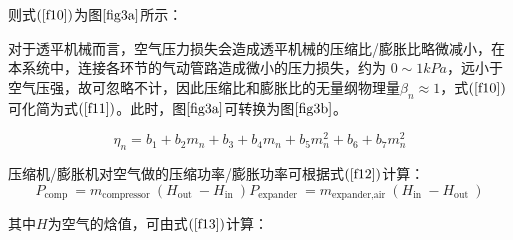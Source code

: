 \documentclass{jnuthesis}
\begin{document}
	则式$ (\fontsize{10.5bp}{10pt}\ref{f10}) $为图$ \fontsize{10.5bp}{10pt}\ref{fig3a} $所示：
	
	
	对于透平机械而言，空气压力损失会造成透平机械的压缩比/膨胀比略微减小，在本系统中，连接各环节的气动管路造成微小的压力损失，约为 $ 0\sim 1 k P a $，远小于空气压强，故可忽略不计，因此压缩比和膨胀比的无量纲物理量$ \beta_{n} \approx 1 $，式$ (\fontsize{10.5bp}{10pt}\ref{f10}) $可化简为式$ (\fontsize{10.5bp}{10pt}\ref{f11}) $。此时，图$ \fontsize{10.5bp}{10pt}\ref{fig3a} $可转换为图$ \fontsize{10.5bp}{10pt}\ref{fig3b} $。
	
	\begin{equation}\label{f11}
		\eta_{n}=b_{1}+b_{2} m_{n}+b_{3}+b_{4} m_{n}+b_{5} m_{n}^{2}+b_{6}+b_{7} m_{n}^{2}
	\end{equation}
	
	压缩机/膨胀机对空气做的压缩功率/膨胀功率可根据式$ (\fontsize{10.5bp}{10pt}\ref{f12}) $计算：
	\begin{equation}\label{f12}
		P_{\text {comp }}=m_{\text {compressor }}\left(H_{\text {out }}-H_{\text {in }}\right) P_{\text {expander }}=m_{\text {expander,air }}\left(H_{\text {in }}-H_{\text {out }}\right)
	\end{equation}
	
	其中$ H $为空气的焓值，可由式$ (\fontsize{10.5bp}{10pt}\ref{f13}) $计算：
	
\end{document}
